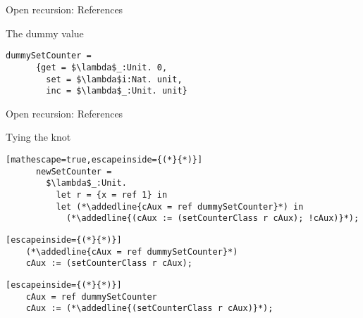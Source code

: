 \documentclass[presentation,xcolor=svgnames]{beamer}
\begin{document}
\begin{frame}[fragile]{Open recursion: References}
  \begin{block}{The dummy value}
    \begin{lstlisting}[mathescape=true]
      dummySetCounter =
      {get = $\lambda$_:Unit. 0,
        set = $\lambda$i:Nat. unit,
        inc = $\lambda$_:Unit. unit}
    \end{lstlisting}
  \end{block}
\end{frame}

\begin{frame}[fragile]{Open recursion: References}
  \begin{block}{Tying the knot}
    \begin{lstlisting}[mathescape=true,escapeinside={(*}{*)}]
      newSetCounter =
        $\lambda$_:Unit.
          let r = {x = ref 1} in
          let (*\addedline{cAux = ref dummySetCounter}*) in
            (*\addedline{(cAux := (setCounterClass r cAux); !cAux)}*);
    \end{lstlisting}
  \end{block}
\end{frame}


\begin{frame}[fragile]
  \begin{lstlisting}[escapeinside={(*}{*)}]
    (*\addedline{cAux = ref dummySetCounter}*)
    cAux := (setCounterClass r cAux);
  \end{lstlisting}

  \begin{center}
  \end{center}
\end{frame}

\begin{frame}[fragile]
  \begin{lstlisting}[escapeinside={(*}{*)}]
    cAux = ref dummySetCounter
    cAux := (*\addedline{(setCounterClass r cAux)}*);
  \end{lstlisting}

  \begin{center}
  \end{center}
\end{frame}
\end{document}
